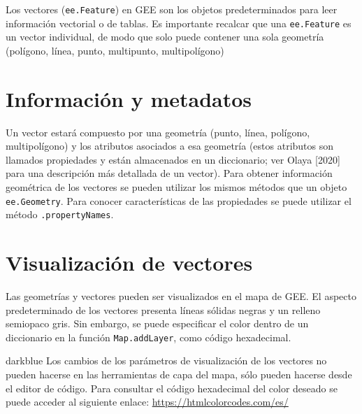 \documentclass[
  12pt,
  letterpaper,
  twoside]{book}
\begin{document}
Los vectores (\texttt{ee.Feature}) en GEE son los objetos predeterminados para leer información vectorial o de tablas.
Es importante recalcar que una \texttt{ee.Feature} es un vector individual, de modo que solo puede contener una sola geometría (polígono, línea, punto, multipunto, multipolígono)

\hypertarget{informaciuxf3n-y-metadatos-1}{%
\section{Información y metadatos}\label{informaciuxf3n-y-metadatos-1}}

Un vector estará compuesto por una geometría (punto, línea, polígono, multipolígono) y los atributos asociados a esa geometría (estos atributos son llamados propiedades y están almacenados en un diccionario; ver Olaya {[}2020{]} para una descripción más detallada de un vector). Para obtener información geométrica de los vectores se pueden utilizar los mismos métodos que un objeto \texttt{ee.Geometry}. Para conocer características de las propiedades se puede utilizar el método \texttt{.propertyNames}.

\hypertarget{visualizaciuxf3n-de-vectores}{%
\section{Visualización de vectores}\label{visualizaciuxf3n-de-vectores}}

Las geometrías y vectores pueden ser visualizados en el mapa de GEE. El aspecto predeterminado de los vectores presenta líneas sólidas negras y un relleno semiopaco gris. Sin embargo, se puede especificar el color dentro de un diccionario en la función \texttt{Map.addLayer}, como código hexadecimal.

\begin{bluebox2}

\begin{awesomeblock}{5pt}{\faLightbulb}{darkblue}
Los cambios de los parámetros de visualización de los vectores no pueden hacerse en las herramientas de capa del mapa, sólo pueden hacerse desde el editor de código. Para consultar el código hexadecimal del color deseado se puede acceder al siguiente enlace: \url{https://htmlcolorcodes.com/es/}

\end{awesomeblock}

\end{bluebox2}
\end{document}
